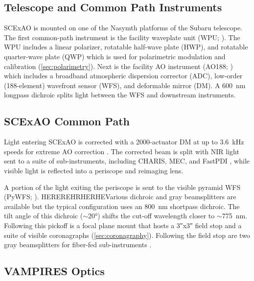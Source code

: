\subsection{Telescope and Common Path Instruments}

SCExAO is mounted on one of the Nasymth platforms of the Subaru telescope. The first common-path instrument is the facility waveplate unit (WPU; \citealp{watanabe_near-infrared_2018}). The WPU includes a linear polarizer, rotatable half-wave plate (HWP), and rotatable quarter-wave plate (QWP) which is used for polarimetric modulation and calibration (\autoref{sec:polarimetry}). Next is the facility AO instrument (AO188; \citealp{minowa_performance_2010}) which includes a broadband atmospheric dispersion corrector (ADC), low-order (188-element) wavefront sensor (WFS), and deformable mirror (DM). A \SI{600}{\nano\meter} longpass dichroic splits light between the WFS and downstream instruments.

\subsection{SCExAO Common Path}

Light entering SCExAO is corrected with a 2000-actuator DM at up to \SI{3.6}{\kilo\hertz} speeds for extreme AO correction \citep{lozi_new_2020,ahn_scexao_2021}. The corrected beam is split with NIR light sent to a suite of sub-instruments, including CHARIS, MEC, and FastPDI \citep{groff_charis_2015,steiger_probing_2022,lozi_status_2020}, while visible light is reflected into a periscope and reimaging lens.

A portion of the light exiting the periscope is sent to the visible pyramid WFS (PyWFS; \citealp{lozi_visible_2019}). HEREREHRHERHEVarious dichroic and gray beamsplitters are available but the typical configuration uses an \SI{800}{\nano\meter} shortpass dichroic. The tilt angle of this dichroic ($\sim$\ang{20}) shifts the cut-off wavelength closer to $\sim$\SI{775}{\nano\meter}. Following this pickoff is a focal plane mount that hosts a \ang{;;3}x\ang{;;3} field stop and a suite of visible coronagraphs (\autoref{sec:coronagraphy}). Following the field stop are two gray beamsplitters for fiber-fed sub-instruments \citep{vievard_single-aperture_2023,vievard_photonic_2023}.

\subsection{VAMPIRES Optics}


